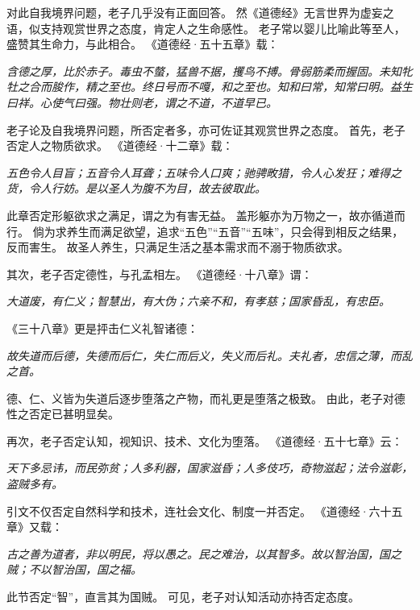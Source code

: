 \documentclass[11pt]{article}
\begin{document}
\par

对此自我境界问题，老子几乎没有正面回答。
然《道德经》无言世界为虚妄之语，似支持观赏世界之态度，肯定人之生命感性。
老子常以婴儿比喻此等至人，盛赞其生命力，与此相合。
《道德经·五十五章》载：

\textit{含德之厚，比於赤子。毒虫不螫，猛兽不据，攫鸟不搏。骨弱筋柔而握固。未知牝牡之合而朘作，精之至也。终日号而不嘎，和之至也。知和曰常，知常曰明。益生曰祥。心使气曰强。物壮则老，谓之不道，不道早已。}

\par

老子论及自我境界问题，所否定者多，亦可佐证其观赏世界之态度。
首先，老子否定人之物质欲求。
《道德经·十二章》载：

\textit{五色令人目盲；五音令人耳聋；五味令人口爽；驰骋畋猎，令人心发狂；难得之货，令人行妨。是以圣人为腹不为目，故去彼取此。}

此章否定形躯欲求之满足，谓之为有害无益。
盖形躯亦为万物之一，故亦循道而行。
倘为求养生而满足欲望，追求“五色”“五音”“五味”，只会得到相反之结果，反而害生。
故圣人养生，只满足生活之基本需求而不溺于物质欲求。

\par

其次，老子否定德性，与孔孟相左。
《道德经·十八章》谓：

\textit{大道废，有仁义；智慧出，有大伪；六亲不和，有孝慈；国家昏乱，有忠臣。}

《三十八章》更是抨击仁义礼智诸德：

\textit{故失道而后德，失德而后仁，失仁而后义，失义而后礼。夫礼者，忠信之薄，而乱之首。}

德、仁、义皆为失道后逐步堕落之产物，而礼更是堕落之极致。
由此，老子对德性之否定已甚明显矣。

\par

再次，老子否定认知，视知识、技术、文化为堕落。
《道德经·五十七章》云：

\textit{天下多忌讳，而民弥贫；人多利器，国家滋昏；人多伎巧，奇物滋起；法令滋彰，盗贼多有。}

引文不仅否定自然科学和技术，连社会文化、制度一并否定。
《道德经·六十五章》又载：

\textit{古之善为道者，非以明民，将以愚之。民之难治，以其智多。故以智治国，国之贼；不以智治国，国之福。}

此节否定“智”，直言其为国贼。
可见，老子对认知活动亦持否定态度。

\par
\end{document}
